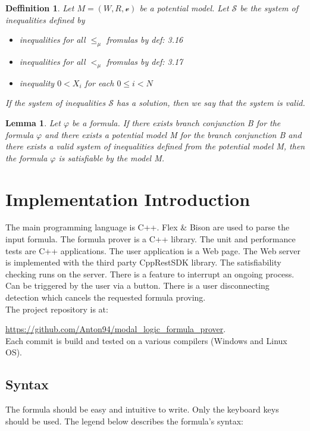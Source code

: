 \documentclass{article}
\newtheorem{defn}[theorem]{Deffinition}
\newtheorem{lemma}[theorem]{Lemma}
\newcommand{\vE}{\mathscr{v}}
\begin{document}
		\begin{defn}
			Let $M = (W, R, \vE)$ be a potential model. Let $\mathscr{S}$ be the system of inequalities defined by
			\begin{itemize}
				\item inequalities for all $\le_\mu$ fromulas by def: 3.16 
				\item inequalities for all $<_\mu$ fromulas by def: 3.17
				\item inequality $0 < X_i$ for each $0 \le i < N$  
			\end{itemize}
			If the system of inequalities $\mathscr{S}$ has a solution, then we say that the system is valid.
		\end{defn}
		\begin{lemma}
			\label{building-lemma}
			Let $\varphi$ be a formula. If there exists branch conjunction B for the formula $\varphi$
			and there exists a potential model M for the branch conjunction B and 
			there exists a valid system of inequalities defined from the potential model M,
			then the formula $\varphi$ is satisfiable by the model M.
		\end{lemma}

	\newpage
	\section{Implementation Introduction}
	The main programming language is C++. Flex \& Bison are used to parse the input formula. The formula prover is a C++ library. The unit and performance tests are C++ applications.
	The user application is a Web page. The Web server is implemented with the third party CppRestSDK library. The satisfiability checking runs on the server. There is a feature to interrupt an ongoing process. Can be triggered by the user via a button. There is a user disconnecting detection which cancels the requested formula proving. \\
	The project repository is at:

	\url{https://github.com/Anton94/modal_logic_formula_prover}. \\
	Each commit is build and tested on a various compilers (Windows and Linux OS).
		
	\subsection{Syntax}
	The formula should be easy and intuitive to write. Only the keyboard keys should be used. The legend below describes the formula's syntax:
\end{document}
